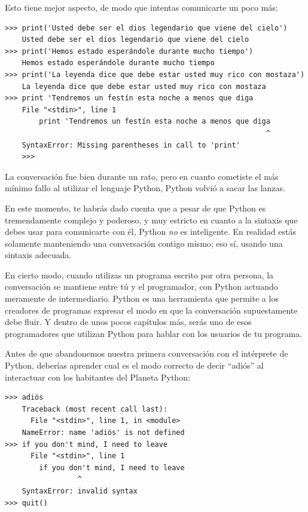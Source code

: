 Esto tiene mejor aspecto, de modo que intentas comunicarte un poco más:

\begin{Verbatim}[frame=single]
>>> print('Usted debe ser el dios legendario que viene del cielo')
    Usted debe ser el dios legendario que viene del cielo
>>> print('Hemos estado esperándole durante mucho tiempo')
    Hemos estado esperándole durante mucho tiempo
>>> print('La leyenda dice que debe estar usted muy rico con mostaza')
    La leyenda dice que debe estar usted muy rico con mostaza
>>> print 'Tendremos un festín esta noche a menos que diga
    File "<stdin>", line 1
        print 'Tendremos un festín esta noche a menos que diga
                                                             ^
    SyntaxError: Missing parentheses in call to 'print'
    >>>
\end{Verbatim}

La conversación fue bien durante un rato, pero en cuanto cometiste el
más mínimo fallo al utilizar el lenguaje Python, Python volvió a sacar
las lanzas.

En este momento, te habrás dado cuenta que a pesar de que Python es
tremendamente complejo y poderoso, y muy estricto en cuanto a la
sintaxis que debes usar para comunicarte con él, Python \emph{no} es
inteligente. En realidad estás solamente manteniendo una conversación
contigo mismo; eso sí, usando una sintaxis adecuada.

En cierto modo, cuando utilizas un programa escrito por otra persona, la
conversación se mantiene entre tú y el programador, con Python actuando
meramente de intermediario. Python es una herramienta que permite a los
creadores de programas expresar el modo en que la conversación
supuestamente debe fluir. Y dentro de unos pocos capítulos más, serás
uno de esos programadores que utilizan Python para hablar con los
usuarios de tu programa.

Antes de que abandonemos nuestra primera conversación con el intérprete
de Python, deberías aprender cual es el modo correcto de decir ``adiós''
al interactuar con los habitantes del Planeta Python:

\begin{Verbatim}[frame=single]
>>> adiós
    Traceback (most recent call last):
      File "<stdin>", line 1, in <module>
    NameError: name 'adiós' is not defined
>>> if you don't mind, I need to leave
      File "<stdin>", line 1
        if you don't mind, I need to leave
                 ^
    SyntaxError: invalid syntax
>>> quit()
\end{Verbatim}

